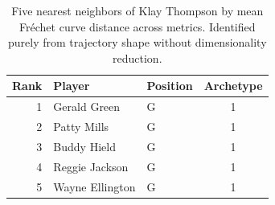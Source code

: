 \begin{table}[htbp]
  \centering\small
  \begin{tabular}{rllc}
    \toprule
    Rank & Player & Position & Archetype \\
    \midrule
    1 & Gerald Green & G & 1 \\
    2 & Patty Mills & G & 1 \\
    3 & Buddy Hield & G & 1 \\
    4 & Reggie Jackson & G & 1 \\
    5 & Wayne Ellington & G & 1 \\
    \bottomrule
  \end{tabular}
  \caption{Five nearest neighbors of Klay Thompson by mean Fr\'{e}chet curve distance across metrics. Identified purely from trajectory shape without dimensionality reduction.}
  \label{tab:Klay_Thompson_frechet_curve_neighbors}
\end{table}

